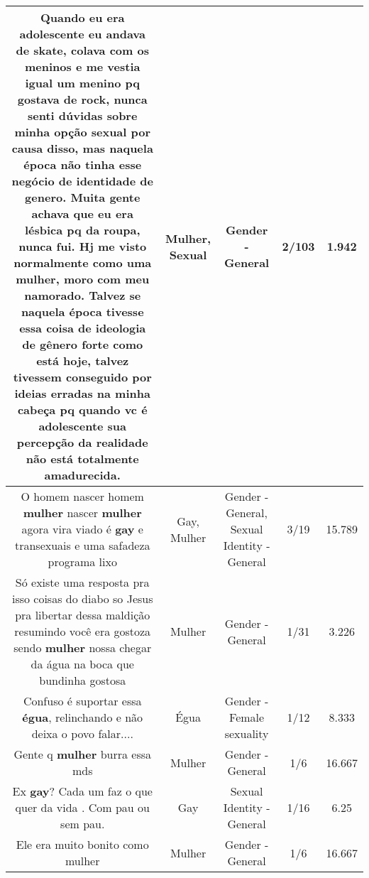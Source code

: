 \documentclass[11pt]{article}
\newlength\mylength
\begin{document}
\begin{center}
\begin{longtable}{|C{.65\mylength}|C{.30\mylength}|C{.12\mylength}|C{.12\mylength}|C{.12\mylength}|}
  \small Quando eu era adolescente eu andava de skate, colava com os meninos e me vestia igual um menino pq gostava de rock, nunca senti dúvidas sobre minha opção \textbf{sexual} por causa disso, mas naquela época não tinha esse negócio de identidade de genero. Muita gente achava que eu era lésbica pq da roupa, nunca fui. Hj me visto normalmente como uma \textbf{mulher}, moro com meu namorado. Talvez se naquela época tivesse essa coisa de ideologia de gênero forte como está hoje, talvez tivessem conseguido por ideias erradas na minha cabeça pq quando vc é adolescente sua percepção da realidade não está totalmente amadurecida.\normalsize   & Mulher, Sexual & Gender - General & 2/103 & 1.942 \\  \hline
  \small O homem nascer homem \textbf{mulher} nascer \textbf{mulher} agora vira viado é \textbf{gay} e transexuais e uma safadeza   programa lixo\normalsize   & Gay, Mulher & Gender - General, Sexual Identity - General & 3/19 & 15.789 \\  \hline
  \small Só existe uma resposta pra isso coisas do diabo  so Jesus pra libertar dessa maldição  resumindo  você era gostoza sendo \textbf{mulher} nossa chegar da água na boca que bundinha gostosa\normalsize   & Mulher & Gender - General & 1/31 & 3.226 \\  \hline
  \small Confuso é suportar essa \textbf{égua}, relinchando e não deixa o povo falar....\normalsize   & Égua & Gender - Female sexuality & 1/12 & 8.333 \\  \hline
  \small Gente q \textbf{mulher} burra essa mds\normalsize   & Mulher & Gender - General & 1/6 & 16.667 \\  \hline
  \small Ex \textbf{gay}?  Cada um faz o que quer da vida . Com pau ou sem pau.\normalsize   & Gay & Sexual Identity - General & 1/16 & 6.25 \\  \hline
  \small Ele era muito bonito como mulher\normalsize   & Mulher & Gender - General & 1/6 & 16.667 \\  \hline

\end{longtable}
\end{center}
\end{document}
